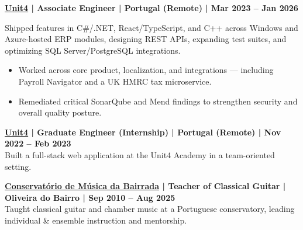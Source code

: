 \documentclass[a4paper,10pt]{article}
\begin{document}
\begin{tcolorbox}[jobbox]
\textbf{\href{https://www.unit4.com/}{Unit4} | Associate Engineer | Portugal (Remote) | Mar 2023 -- Jan 2026}\\
{\small
Shipped features in C\#/.NET, React/TypeScript, and C++ across Windows and Azure-hosted ERP modules, designing REST APIs, expanding test suites, and optimizing SQL Server/PostgreSQL integrations.
\begin{itemize}[leftmargin=*, itemsep=1.5pt]
  \item Worked across core product, localization, and integrations — including Payroll Navigator and a UK HMRC tax microservice.
  \item Remediated critical SonarQube and Mend findings to strengthen security and overall quality posture.
\end{itemize}
}
\vspace{4pt}

\textbf{\href{https://www.unit4.com/}{Unit4} | Graduate Engineer (Internship) | Portugal (Remote) | Nov 2022 -- Feb 2023}\\
{\small
Built a full-stack web application at the Unit4 Academy in a team-oriented setting.
}
\end{tcolorbox}

\begin{tcolorbox}[jobbox]
\textbf{\href{https://escolartes.com}{Conservatório de Música da Bairrada} | Teacher of Classical Guitar | Oliveira do Bairro | Sep 2010 -- Aug 2025}\\
{\small
Taught classical guitar and chamber music at a Portuguese conservatory, leading individual \& ensemble instruction and mentorship.
}
\end{tcolorbox}
\end{document}
